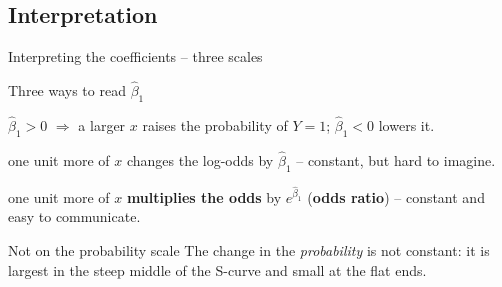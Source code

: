 \documentclass[aspectratio=169,11pt]{beamer}
\begin{document}
\subsection{Interpretation}

\begin{frame}{Interpreting the coefficients -- three scales}
  \begin{block}{Three ways to read $\hat\beta_1$}
    \begin{description}\setlength{\itemsep}{3pt}
      \item[Sign:] $\hat\beta_1>0$ $\Rightarrow$ a larger $x$ raises the
            probability of $Y=1$; $\hat\beta_1<0$ lowers it.
      \item[Log-odds:] one unit more of $x$ changes the log-odds by
            $\hat\beta_1$ -- constant, but hard to imagine.
      \item[Odds:] one unit more of $x$ \textbf{multiplies the odds} by
            $e^{\hat\beta_1}$ (\textbf{odds ratio}) -- constant and easy to
            communicate.
    \end{description}
  \end{block}
  \begin{alertblock}{Not on the probability scale}
    The change in the \emph{probability} is not constant: it is largest in
    the steep middle of the S-curve and small at the flat ends.
  \end{alertblock}
\end{frame}
\end{document}
